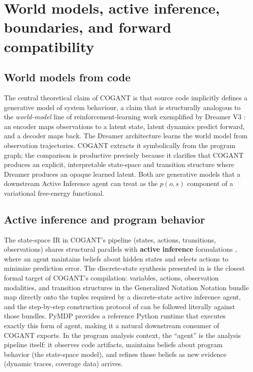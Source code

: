 \documentclass[
]{article}
\begin{document}
\section{World models, active inference, boundaries, and forward
compatibility}\label{world-models-active-inference-boundaries-and-forward-compatibility}

\subsection{World models from code}\label{world-models-from-code}

The central theoretical claim of COGANT is that source code implicitly
defines a generative model of system behaviour, a claim that is
structurally analogous to the \emph{world-model} line of
reinforcement-learning work exemplified by Dreamer V3
\citep{hafner2023dreamerv3}: an encoder maps observations to a latent
state, latent dynamics predict forward, and a decoder maps back. The
Dreamer architecture learns the world model from observation
trajectories. COGANT extracts it symbolically from the program graph;
the comparison is productive precisely because it clarifies that COGANT
produces an explicit, interpretable state-space and transition structure
where Dreamer produces an opaque learned latent. Both are generative
models that a downstream Active Inference agent
\citep{friston2010free, parr2022active, dacosta2020active, heins2022pymdp}
can treat as the \(p(o, s)\) component of a variational free-energy
functional.

\subsection{Active inference and program
behavior}\label{active-inference-and-program-behavior}

The state-space IR in COGANT's pipeline (states, actions, transitions,
observations) shares structural parallels with \textbf{active inference}
formulations \citep{friston2010free, parr2022active}, where an agent
maintains beliefs about hidden states and selects actions to minimize
prediction error. The discrete-state synthesis presented in
\citep{dacosta2020active} is the closest formal target of COGANT's
compilation: variables, actions, observation modalities, and transition
structures in the Generalized Notation Notation bundle map directly onto
the tuples required by a discrete-state active inference agent, and the
step-by-step construction protocol of \citep{smith2022stepbystep} can be
followed literally against those bundles. PyMDP \citep{heins2022pymdp}
provides a reference Python runtime that executes exactly this form of
agent, making it a natural downstream consumer of COGANT exports. In the
program analysis context, the ``agent'' is the analysis pipeline itself:
it observes code artifacts, maintains beliefs about program behavior
(the state-space model), and refines those beliefs as new evidence
(dynamic traces, coverage data) arrives.
\end{document}

